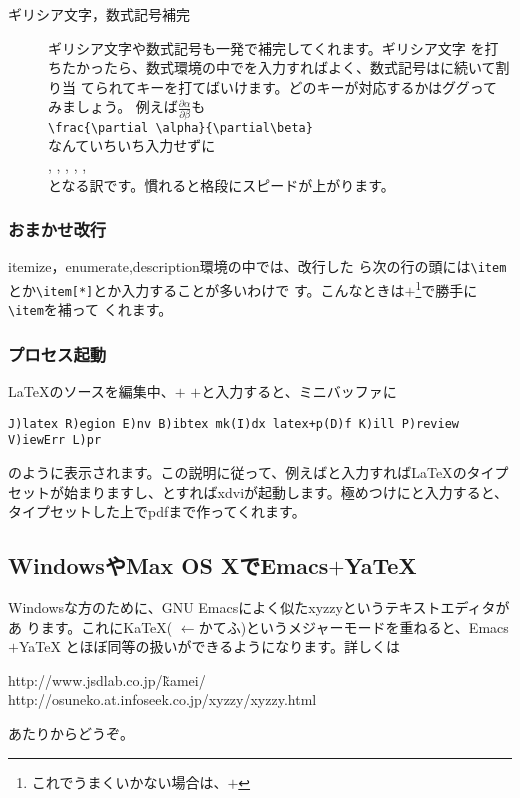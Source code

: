 \begin{description}
 \item[ギリシア文字，数式記号補完]
	    ギリシア文字や数式記号も一発で補完してくれます。ギリシア文字
	    を打ちたかったら、数式環境の中で\keytop{:}を入力すればよく、数式記号は\keytop{;}に続いて割り当
	    てられてキーを打てばいけます。どのキーが対応するかはググって
	    みましょう。
            例えば$\displaystyle \frac{\partial \alpha}{\partial\beta}$も\\
	    \verb+\frac{\partial \alpha}{\partial\beta}+\\
            なんていちいち入力せずに\\
	    \keytop{;}  , \keytop{;} 
	    , \keytop{:}  ,
	    , \keytop{;}  ,
	    \keytop{:}  \\
	    となる訳です。慣れると格段にスピードが上がります。

\end{description}

\subsubsection{おまかせ改行}
itemize，enumerate,description環境の中では、改行した
ら次の行の頭には\verb+\item+とか\verb+\item[*]+とか入力することが多いわけで
す。こんなときは$+$\footnote{これでうまくいかない場合は、$+$}で勝手に\verb+\item+を補って
くれます。

\subsubsection{プロセス起動}
{\LaTeX}のソースを編集中、$+$ $+$と入力すると、ミニバッファに
\begin{screen}
\begin{verbatim}
J)latex R)egion E)nv B)ibtex mk(I)dx latex+p(D)f K)ill P)review V)iewErr L)pr
\end{verbatim}
\end{screen}
のように表示されます。この説明に従って、例えばと入力すれば{\LaTeX}のタイプセットが始まりますし、とすればxdviが起動します。極めつけにと入力すると、タイプセットした上でpdfまで作ってくれます。

\subsection{WindowsやMax OS XでEmacs$+$YaTeX}
Windowsな方のために、GNU Emacsによく似たxyzzyというテキストエディタがあ
ります。これにKaTeX(
$\leftarrow$かてふ)というメジャーモードを重ねると、Emacs$+$YaTeX
とほぼ同等の扱いができるようになります。詳しくは
\begin{screen}
 http://www.jsdlab.co.jp/\~kamei/\\
 http://osuneko.at.infoseek.co.jp/xyzzy/xyzzy.html
\end{screen}
あたりからどうぞ。

